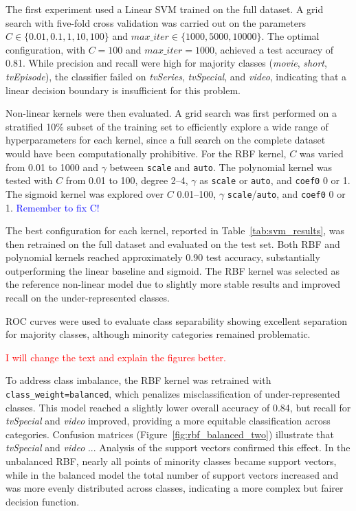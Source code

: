 The first experiment used a Linear SVM trained on the full dataset.  
A grid search with five-fold cross validation was carried out on the parameters 
$C \in \{0.01, 0.1, 1, 10, 100\}$ and $max\_iter \in \{1000, 5000, 10000\}$. 
The optimal configuration, with $C=100$ and $max\_iter=1000$, achieved a test accuracy of 0.81. 
While precision and recall were high for majority classes (\textit{movie}, \textit{short}, \textit{tvEpisode}), 
the classifier failed on \textit{tvSeries}, \textit{tvSpecial}, and \textit{video}, 
indicating that a linear decision boundary is insufficient for this problem.  

Non-linear kernels were then evaluated. 
A grid search was first performed on a stratified 10\% subset of the training set to efficiently explore a wide range of hyperparameters for each kernel, 
since a full search on the complete dataset would have been computationally prohibitive. 
For the RBF kernel, $C$ was varied from 0.01 to 1000 and $\gamma$ between \texttt{scale} and \texttt{auto}. 
The polynomial kernel was tested with $C$ from 0.01 to 100, degree 2--4, $\gamma$ as \texttt{scale} or \texttt{auto}, and \texttt{coef0} 0 or 1. 
The sigmoid kernel was explored over $C$ 0.01--100, $\gamma$ \texttt{scale}/\texttt{auto}, and \texttt{coef0} 0 or 1. 
\textcolor{blue}{Remember to fix C!}

The best configuration for each kernel, reported in Table~\ref{tab:svm_results}, was then retrained on the full dataset and evaluated on the test set. 
Both RBF and polynomial kernels reached approximately 0.90 test accuracy, substantially outperforming the linear baseline and sigmoid. 
The RBF kernel was selected as the reference non-linear model due to slightly more stable results and improved recall on the under-represented classes.


ROC curves were used to evaluate class separability 
showing excellent separation for majority classes, although minority categories remained problematic. 

\textcolor{red}{I will change the text and explain the figures better.}

To address class imbalance, the RBF kernel was retrained with \texttt{class\_weight=balanced}, 
which penalizes misclassification of under-represented classes. 
This model reached a slightly lower overall accuracy of 0.84, 
but recall for \textit{tvSpecial} and \textit{video} improved, providing a more equitable classification across categories.  
Confusion matrices (Figure~\ref{fig:rbf_balanced_two}) 
illustrate that \textit{tvSpecial} and \textit{video} ...  
Analysis of the support vectors confirmed this effect. 
In the unbalanced RBF, nearly all points of minority classes became support vectors, 
while in the balanced model the total number of support vectors increased and was more evenly distributed across classes, 
indicating a more complex but fairer decision function. 

